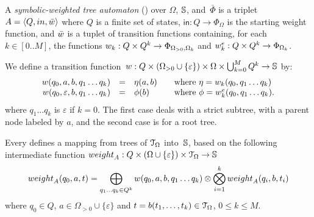 %
\begin{definition}  \label{def:SWTA}
A \emph{symbolic-weighted tree automaton} (\SWTA)
over $\Omega$, $\mathbb{S}$, and~$\bar\Phi$
is a triplet $A = \< Q, \init, \bar{\wei} >$ where
$Q$ is a finite set of states,
$\mathsf{in} : Q \to \Phi_\Omega$ is the starting weight function,
and $\bar{\wei}$ is a tuplet of transition functions containing,
for each $k \in [0..M]$,
the functions $\wei_{k}: Q \times Q^{k} \to \Phi_{\Omega_{>0},\Omega_k}$
and $\weie[k]: Q \times Q^{k} \to \Phi_{\Omega_k}$.
\end{definition}
%
We define %
a transition
function~$\wei: Q \times (\Omega_{> 0} \cup \{ \varepsilon \}) \times \Omega \times \bigcup_{k=0}^{M} Q^k
  \to \Semiring$
by: %
\[
\begin{array}{rcll}
\wei(q_0, a, b, q_1 \ldots q_k) & = & \eta(a, b) &
\quad\mathrm{where~} \eta = \wei_{k}(q_0, q_1\ldots q_k)\\
\wei(q_0, \varepsilon, b, q_1 \ldots q_k) & = & \phi(b) &
\quad\mathrm{where~} \phi = \weie[k](q_0, q_1\ldots q_k).
\end{array}
\]
%
\noindent
where $q_1\ldots q_k$ is $\varepsilon$ if $k = 0$.
The first case deals with a strict subtree, with a parent node labeled by $a$,
and the second case is for a root tree.

\noindent
Every \SWTA %
defines a mapping
from trees of $\mathcal{T}_\Omega$ into~$\mathbb{S}$, %
based on the following intermediate function
$\weight_A: Q \times (\Omega \cup \{ \varepsilon \}) \times \T_\Omega \to \Semiring$
\begin{equation}
\weight_A(q_0, a, t) =  %
 \displaystyle\bigoplus_{q_1 \ldots q_k \in Q^k} %
              \wei(q_0, a, b, q_1 \ldots q_k )
   \otimes \displaystyle\bigotimes_{i=1}^{k}
           \weight_A(q_i, b, t_i)
\end{equation}
where $q_0 \in Q$, $a \in \Omega_{>0} \cup \{ \varepsilon \}$ and
$t = b(t_1,\ldots, t_k) \in \mathcal{T}_\Omega$,
$0 \leq k \leq M$.

